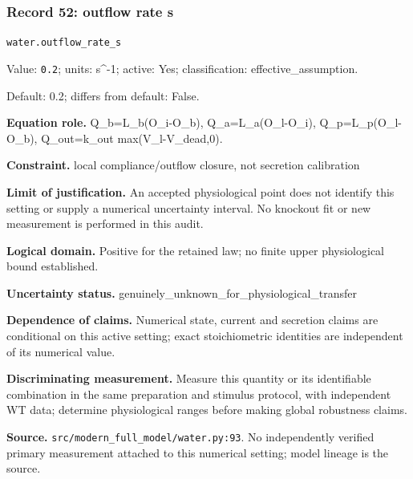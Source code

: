 \subsubsection*{Record 52: outflow rate s}
{\small \nolinkurl{water.outflow_rate_s}\par

Value: \texttt{0.2}; units: s\textasciicircum{}-1; active: Yes; classification: effective\_assumption.\par

Default: 0.2; differs from default: False.\par

\textbf{Equation role.} Q\_b=L\_b(O\_i-O\_b), Q\_a=L\_a(O\_l-O\_i), Q\_p=L\_p(O\_l-O\_b), Q\_out=k\_out max(V\_l-V\_dead,0).\par

\textbf{Constraint.} local compliance/outflow closure, not secretion calibration\par

\textbf{Limit of justification.} An accepted physiological point does not identify this setting or supply a numerical uncertainty interval. No knockout fit or new measurement is performed in this audit.\par

\textbf{Logical domain.} Positive for the retained law; no finite upper physiological bound established.\par

\textbf{Uncertainty status.} genuinely\_unknown\_for\_physiological\_transfer\par

\textbf{Dependence of claims.} Numerical state, current and secretion claims are conditional on this active setting; exact stoichiometric identities are independent of its numerical value.\par

\textbf{Discriminating measurement.} Measure this quantity or its identifiable combination in the same preparation and stimulus protocol, with independent WT data; determine physiological ranges before making global robustness claims.\par

\textbf{Source.} \nolinkurl{src/modern_full_model/water.py:93}. No independently verified primary measurement attached to this numerical setting; model lineage is the source.\par}

